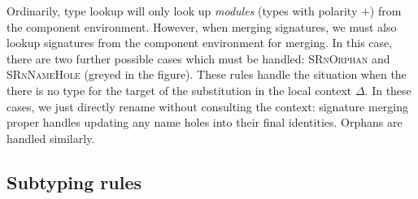 
Ordinarily, type lookup will only look up \emph{modules} (types
with polarity $+$) from the component environment.  However, when merging
signatures, we must also lookup signatures from the component environment
for merging.  In this case, there are two further possible cases which
must be handled: \textsc{SRnOrphan} and \textsc{SRnNameHole} (greyed in
the figure).  These rules handle the situation when the there is no
type for the target of the substitution in the local context $\Delta$.
In these cases, we just directly rename without consulting the context:
signature merging proper handles updating any name holes into their
final identities.  Orphans are handled similarly.




\subsection{Subtyping rules}
\label{sec:subtyping}




